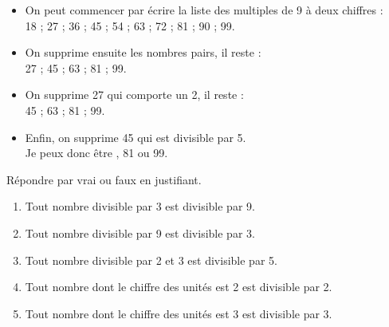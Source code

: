 \begin{colonne*exercice}
\begin{corrige}
   \begin{itemize}
      \item On peut commencer par écrire la liste des multiples de 9 à deux chiffres : \\
         18 ; 27 ; 36 ; 45 ; 54 ; 63 ; 72 ; 81 ; 90 ; 99.
      \item On supprime ensuite les nombres pairs, il reste : \\
         27 ; 45 ; 63 ; 81 ; 99.
      \item On supprime 27 qui comporte un 2, il reste : \\
         45 ; 63 ; 81 ; 99. \\
      \item Enfin, on supprime 45 qui est divisible par 5. \\
         Je peux donc être {, 81 ou 99}.
   \end{itemize}
\end{corrige}

\bigskip


\begin{exercice} %
   Répondre par vrai ou faux en justifiant.
   \begin{enumerate}
      \item Tout nombre divisible par 3 est divisible par 9.
      \item Tout nombre divisible par 9 est divisible par 3.
      \item Tout nombre divisible par 2 et 3 est divisible par 5.
      \item Tout nombre dont le chiffre des unités est 2 est divisible par 2. 
      \item Tout nombre dont le chiffre des unités est 3 est divisible par 3.
   \end{enumerate}
\end{exercice}


\end{colonne*exercice}
